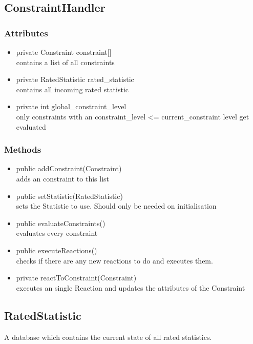 
\subsection{ConstraintHandler}
\subsubsection{Attributes}
\begin{itemize}
	\item private  Constraint constraint[]\\
	contains a list of all constraints
	\item private  RatedStatistic rated\_statistic\\
	contains all incoming rated statistic
	\item private  int global\_constraint\_level\\
	only constraints with an constraint\_level <= current\_constraint level get evaluated
\end{itemize}
\subsubsection{Methods}
\begin{itemize}
	\item public addConstraint(Constraint) \\
		adds an constraint to this list
	\item public setStatistic(RatedStatistic) \\
		sets the Statistic to use. Should only be needed on initialisation
	\item public evaluateConstraints() \\
		evaluates every constraint
	\item public executeReactions() \\
		checks if there are any new reactions to do and executes them.
	\item private reactToConstraint(Constraint) \\
		executes an single Reaction and updates the attributes of the Constraint
\end{itemize}


\subsection{RatedStatistic}
A database which contains the current state of all rated statistics.
